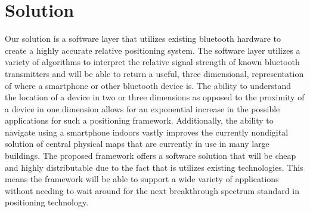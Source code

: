 \section{Solution}

Our solution
is a software layer that utilizes existing bluetooth hardware to create a highly accurate relative positioning system.
The software layer utilizes a variety of algorithms to interpret the relative signal strength of known bluetooth transmitters
and will be able to return a useful, three dimensional, representation of where a smartphone or other bluetooth device is.
The ability to understand the location of a device in two or three dimensions as opposed to the proximity of a device in one
dimension allows for an exponential increase in the possible applications for such a positioning framework.  Additionally,
the ability to navigate using a smartphone indoors vastly improves the currently nondigital solution of central physical maps
that are currently in use in many large buildings.  The proposed framework offers a software solution that will be cheap and
highly distributable due to the fact that is utilizes existing technologies.  This means the framework will be able to support a
wide variety of applications without needing to wait around for the next breakthrough spectrum standard in positioning technology.

